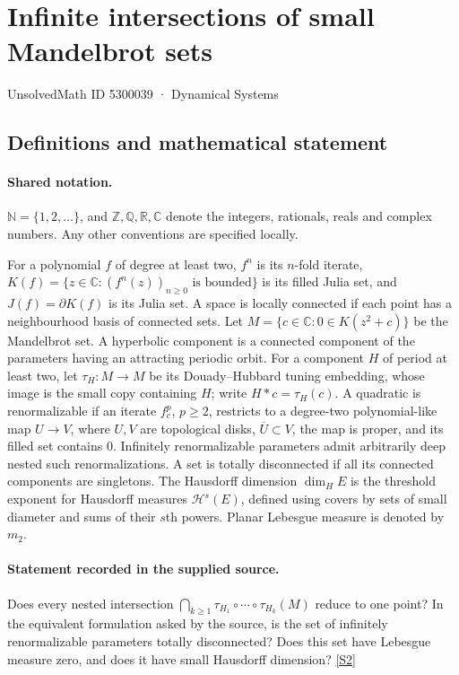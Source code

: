 \documentclass[11pt]{article}
\newcommand{\sref}[2]{\hyperlink{source:#1:#2}{[S#2]}}
\begin{document}
\setcounter{section}{5300038}
\section{Infinite intersections of small Mandelbrot sets}\label{5300039}
{\small\sffamily UnsolvedMath ID 5300039 · Dynamical Systems}
\subsection{Definitions and mathematical statement}

\paragraph{Shared notation.}$\mathbb N=\{1,2,\ldots\}$, and $\mathbb Z,\mathbb Q,\mathbb R,\mathbb C$ denote the integers, rationals, reals and complex numbers. Any other conventions are specified locally.


For a polynomial $f$ of degree at least two, $f^n$ is its $n$-fold iterate, $K(f)=\{z\in\mathbb C:(f^n(z))_{n\geq0}\text{ is bounded}\}$ is its filled Julia set, and $J(f)=\partial K(f)$ is its Julia set. A space is locally connected if each point has a neighbourhood basis of connected sets. Let $M=\{c\in\mathbb C:0\in K(z^2+c)\}$ be the Mandelbrot set. A hyperbolic component is a connected component of the parameters having an attracting periodic orbit. For a component $H$ of period at least two, let $\tau_H:M\to M$ be its Douady--Hubbard tuning embedding, whose image is the small copy containing $H$; write $H*c=\tau_H(c)$. A quadratic is renormalizable if an iterate $f_c^p$, $p\geq2$, restricts to a degree-two polynomial-like map $U\to V$, where $U,V$ are topological disks, $\overline U\subset V$, the map is proper, and its filled set contains $0$. Infinitely renormalizable parameters admit arbitrarily deep nested such renormalizations. A set is totally disconnected if all its connected components are singletons. The Hausdorff dimension $\dim_H E$ is the threshold exponent for Hausdorff measures $\mathcal H^s(E)$, defined using covers by sets of small diameter and sums of their $s$th powers. Planar Lebesgue measure is denoted by $m_2$.
\paragraph{Statement recorded in the supplied source.}
Does every nested intersection $\bigcap_{k\geq1}\tau_{H_1}\circ\cdots\circ\tau_{H_k}(M)$ reduce to one point? In the equivalent formulation asked by the source, is the set of infinitely renormalizable parameters totally disconnected? Does this set have Lebesgue measure zero, and does it have small Hausdorff dimension? \sref{5300039}{2}
\end{document}
